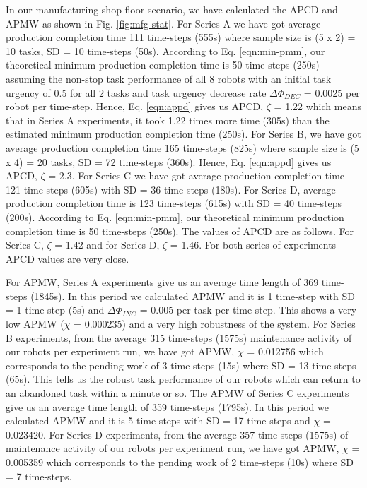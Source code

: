 \documentclass[final,5p,times,twocolumn]{elsarticle}
\begin{document}
In our manufacturing shop-floor scenario, we have calculated the APCD and APMW as shown in Fig. \ref{fig:mfg-stat}. For Series A we have got  average production completion time 111 time-steps (555s) where sample size is (5 x 2) = 10 tasks, SD = 10 time-steps (50s). According to Eq. \ref{eqn:min-pmm}, our theoretical minimum production completion time is 50 time-steps (250s) assuming the non-stop task performance of all 8 robots with an initial task urgency of 0.5 for all 2 tasks and task urgency decrease rate $\Delta \Phi_{DEC }$ = 0.0025 per robot per time-step.  Hence, Eq. \ref{eqn:appd} gives us APCD, $\zeta$ = 1.22 which means that in Series A experiments, it took 1.22 times more time (305s) than the estimated minimum production completion time (250s). For Series B, we have got average production completion time 165 time-steps (825s) where sample size is (5 x 4) = 20 tasks, SD = 72 time-steps (360s).  Hence, Eq. \ref{eqn:appd} gives us APCD, $\zeta$ = 2.3. For Series C we have got average production completion time 121 time-steps (605s) with SD = 36 time-steps (180s). For Series D,  average production completion time is 123 time-steps (615s) with SD = 40 time-steps (200s). According to Eq. \ref{eqn:min-pmm}, our theoretical minimum production completion time is 50 time-steps (250s).  The values of APCD are as follows. For Series C, $\zeta$ = 1.42 and for Series D, $\zeta$ = 1.46. For both series of experiments APCD values are very close.

For APMW, Series A experiments give us an average time length of 369 time-steps (1845s).  In this period we calculated APMW and it is 1 time-step with SD = 1 time-step (5s) and $\Delta \Phi_{INC}$ = 0.005 per task per time-step. This shows a very low APMW ($\chi$ = 0.000235) and a very high robustness of the system. For Series B experiments, from the average 315 time-steps (1575s) maintenance activity of our robots per experiment run, we have got APMW, $\chi$ = 0.012756 which corresponds to the pending work of 3 time-steps (15s) where SD = 13 time-steps (65s). This tells us the robust task performance of our robots which can return to an abandoned task within a minute or so. The APMW of Series C experiments give us an average time length of 359 time-steps (1795s). In this period we calculated APMW and it is 5 time-steps with SD = 17 time-steps and $\chi$ = 0.023420. For Series D experiments, from the average 357 time-steps (1575s) of maintenance activity of our robots per experiment run, we have got APMW, $\chi$ = 0.005359 which corresponds to the pending work of 2 time-steps (10s) where SD = 7 time-steps.
\end{document}
